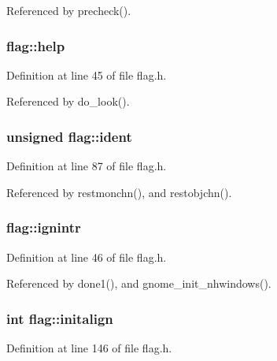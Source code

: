 Referenced by precheck().

\hypertarget{structflag_afab9a20d52e3f18687806681b8c0e993}{
\subsubsection[{help}]{ flag\+::help}}\label{structflag_afab9a20d52e3f18687806681b8c0e993}


Definition at line 45 of file flag.\+h.



Referenced by do\+\_\+look().

\hypertarget{structflag_ab942b8e32836e4e1bc725d7715bacd68}{
\subsubsection[{ident}]{\setlength{\rightskip}{0pt plus 5cm}unsigned flag\+::ident}}\label{structflag_ab942b8e32836e4e1bc725d7715bacd68}


Definition at line 87 of file flag.\+h.



Referenced by restmonchn(), and restobjchn().

\hypertarget{structflag_a6d0389cb18cf906c95391a579f9b14dc}{
\subsubsection[{ignintr}]{ flag\+::ignintr}}\label{structflag_a6d0389cb18cf906c95391a579f9b14dc}


Definition at line 46 of file flag.\+h.



Referenced by done1(), and gnome\+\_\+init\+\_\+nhwindows().

\hypertarget{structflag_a66f0ee2707e5a565a25f948658362ced}{
\subsubsection[{initalign}]{\setlength{\rightskip}{0pt plus 5cm}int flag\+::initalign}}\label{structflag_a66f0ee2707e5a565a25f948658362ced}


Definition at line 146 of file flag.\+h.



